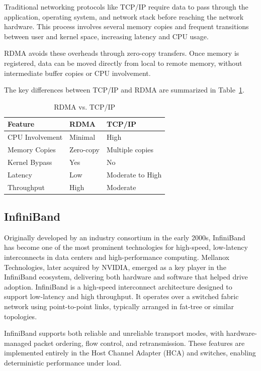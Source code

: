 Traditional networking protocols like TCP/IP require data to pass through the application, operating system, and network stack before reaching the network hardware. This process involves several memory copies and frequent transitions between user and kernel space, increasing latency and CPU usage.

RDMA avoids these overheads through zero-copy transfers. Once memory is registered, data can be moved directly from local to remote memory, without intermediate buffer copies or CPU involvement.

The key differences between TCP/IP and RDMA are summarized in Table~\ref{tab:rdma_vs_tcp}.

\begin{table}[h]
    \centering
    \caption{RDMA vs. TCP/IP}
    \label{tab:rdma_vs_tcp}
    \begin{tabularx}{\textwidth}{|l|X|X|}
        \hline
        \textbf{Feature} & \textbf{RDMA} & \textbf{TCP/IP} \\
        \hline
        CPU Involvement & Minimal & High \\
        Memory Copies   & Zero-copy & Multiple copies \\
        Kernel Bypass   & Yes & No \\
        Latency         & Low & Moderate to High \\
        Throughput      & High & Moderate \\
        \hline
    \end{tabularx}
\end{table}

\subsection{InfiniBand}

Originally developed by an industry consortium in the early 2000s, InfiniBand has become one of the most prominent technologies for high-speed, low-latency interconnects in data centers and high-performance computing. Mellanox Technologies, later acquired by NVIDIA, emerged as a key player in the InfiniBand ecosystem, delivering both hardware and software that helped drive adoption. InfiniBand is a high-speed interconnect architecture designed to support low-latency and high throughput. It operates over a switched fabric network using point-to-point links, typically arranged in fat-tree or similar topologies.

InfiniBand supports both reliable and unreliable transport modes, with hardware-managed packet ordering, flow control, and retransmission. These features are implemented entirely in the Host Channel Adapter (HCA) and switches, enabling deterministic performance under load.


